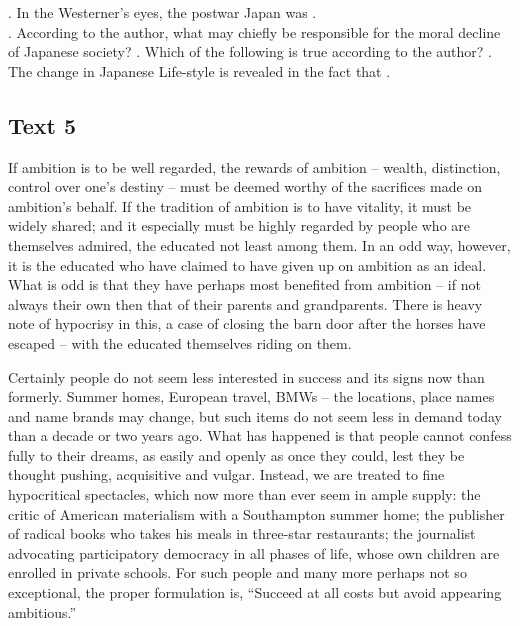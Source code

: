 \begin{questions}  .	In the Westerner’s eyes, the postwar Japan was \ltk{}.\\
 .	According to the author, what may chiefly be responsible for the moral decline of Japanese society?
 .	Which of the following is true according to the author?
 .	The change in Japanese Life-style is revealed in the fact that \ltk{}.\\
\end{questions}    \subsection{Text 5}

If ambition is to be well regarded, the rewards of ambition -- wealth, distinction, control over one’s destiny -- must be deemed worthy of the sacrifices made on ambition’s behalf. If the tradition of ambition is to have vitality, it must be widely shared; and it especially must be highly regarded by people who are themselves admired, the educated not least among them. In an odd way, however, it is the educated who have claimed to have given up on ambition as an ideal. What is odd is that they have perhaps most benefited from ambition -- if not always their own then that of their parents and grandparents. There is heavy note of hypocrisy in this, a case of closing the barn door after the horses have escaped -- with the educated themselves riding on them.

Certainly people do not seem less interested in success and its signs now than formerly. Summer homes, European travel, BMWs -- the locations, place names and name brands may change, but such items do not seem less in demand today than a decade or two years ago. What has happened is that people cannot confess fully to their dreams, as easily and openly as once they could, lest they be thought pushing, acquisitive and vulgar. Instead, we are treated to fine hypocritical spectacles, which now more than ever seem in ample supply: the critic of American materialism with a Southampton summer home; the publisher of radical books who takes his meals in three-star restaurants; the journalist advocating participatory democracy in all phases of life, whose own children are enrolled in private schools. For such people and many more perhaps not so exceptional, the proper formulation is, “Succeed at all costs but avoid appearing ambitious.”

